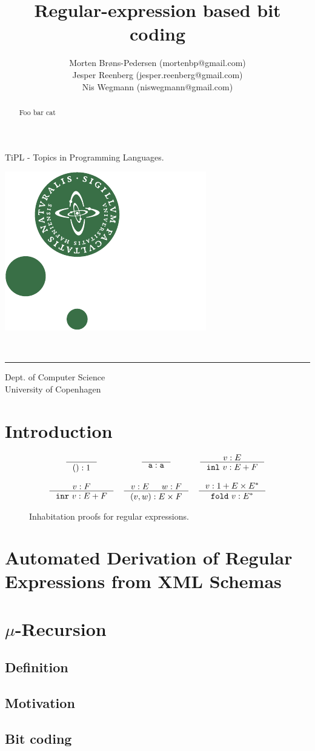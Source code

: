 \documentclass[a4paper, oneside]{memoir}
\title{Regular-expression based bit coding}
\author{Morten Brøns-Pedersen {\footnotesize (mortenbp@gmail.com)}\\
Jesper Reenberg {\footnotesize (jesper.reenberg@gmail.com)} \\
Nis Wegmann {\footnotesize (niswegmann@gmail.com)}}
\makeatletter
\theoremstyle{definition}
\def\maketitle{%
  \null
  \thispagestyle{empty}%
  \vfill
  \begin{center}\leavevmode
    \normalfont
    \Huge{\raggedleft \@title\par}%
    \hrulefill\par
    \Large{\raggedright \subtitle\par}%
    \vskip 2cm
    {\@date\par}%
  \end{center}%
  \vfill
\begin{minipage}{80pt}
\includegraphics*[scale=0.75]{imgs/nat-logo}
\end{minipage}
\begin{minipage}{300pt}
  \begin{flushleft}
    {\large \@author } \\
    {\footnotesize \suplementInfo }

  \end{flushleft}
\end{minipage}
\cleardoublepage %
  \clearpage %
}
\def\subtitle{\footnotesize{TiPL - Topics in Programming Languages.}}
\def\suplementInfo{
  \kern 5pt \hrule width 11pc \kern 5pt %
  Dept. of Computer Science \\
  University of Copenhagen}
\makeatother
\begin{document}
\frontmatter

\maketitle
\thispagestyle{empty}


\begin{abstract}
Foo bar cat
\end{abstract}

\clearpage 

\tableofcontents*

\mainmatter

\section{Introduction}


\begin{figure}
\[
\begin{array}{ccc}
  \inference{}{() : 1}
&
  \inference{}{\texttt{a} : \texttt{a}}
&
  \inference{v : E}{\mathtt{inl}\ v : E + F}
\\
\\
  \inference{v : F}{\mathtt{inr}\ v : E + F}
&
  \inference{v : E & w : F}{(v, w) : E \times F}
&
  \inference{v : 1 + E \times E^{\ast}}{\mathtt{fold}\ v : E^{\ast}}
\end{array}
\]
\caption{Inhabitation proofs for regular expressions.}
\label{fig:inhabitation_proofs}
\end{figure}

\section{Automated Derivation of Regular Expressions from XML Schemas}

\section{$\mu$-Recursion}

\subsection{Definition}

\subsection{Motivation}

\subsection{Bit coding}
\end{document}
